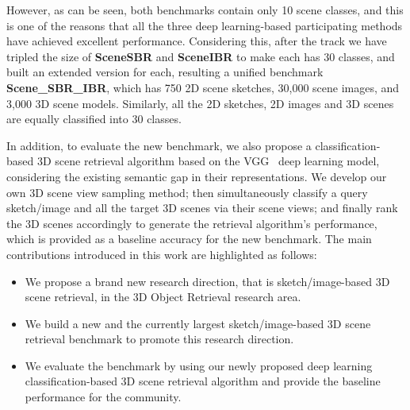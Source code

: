 \documentclass[times, 10pt,twocolumn]{article}
\begin{document}
However, as can be seen, both benchmarks contain only 10 scene classes, and this is one of the reasons that all the three deep learning-based participating methods have achieved excellent performance. Considering this, after the track we have tripled the size of \textbf{SceneSBR} and \textbf{SceneIBR} to make each has 30 classes, and built an extended version for each, resulting a unified benchmark \textbf{Scene\_SBR\_IBR}, which has 750 2D scene sketches, 30,000 scene images, and 3,000 3D scene models. Similarly, all the 2D sketches, 2D images and 3D scenes are equally classified into 30 classes. 



In addition, to evaluate the new benchmark, we also propose a classification-based 3D scene retrieval algorithm based on the VGG~\cite{DBLP:journals/corr/SimonyanZ14a} deep learning model, considering the existing semantic gap in their representations. We develop our own 3D scene view sampling method; then simultaneously classify a query sketch/image and all the target 3D scenes via their scene views; and finally rank the 3D scenes accordingly to generate the retrieval algorithm's performance, which is provided as a baseline accuracy for the new benchmark. The main contributions introduced in this work are highlighted as follows:



\begin{itemize}
    \item We propose a brand new research direction, that is sketch/image-based 3D scene retrieval, in the 3D Object Retrieval research area. 
    \item We build a new and the currently largest sketch/image-based 3D scene retrieval benchmark to promote this research direction. 		
    \item We evaluate the benchmark by using our newly proposed deep learning classification-based 3D scene retrieval algorithm and provide the baseline performance for the community. 
\end{itemize}
\end{document}
